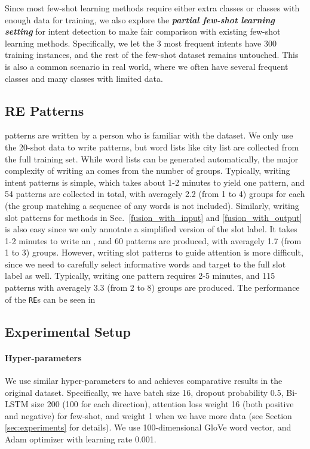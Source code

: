 Since most few-shot learning methods require either extra classes or classes with enough data for training, we also explore the \textbf{\emph{partial few-shot learning setting}} for intent detection to make fair comparison with existing few-shot learning methods. Specifically, we let the 3 most frequent intents have 300 training instances, and the rest of the few-shot dataset remains untouched.
This is also a common scenario in real world, where we often have several frequent classes and many classes with limited data.

\subsection{RE Patterns}
\label{re_in_exp}
\RE patterns are written by a person who is familiar with the dataset.
We only use the 20-shot data to write \RE patterns, but word lists like city list are collected from the full training set. 
While word lists can be generated automatically, the major complexity of writing an \RE comes from the number of groups.
Typically, writing intent patterns is simple, which takes about 1-2 minutes to yield one pattern, and 54 patterns are collected in total, with averagely 2.2 (from 1 to 4) groups for each \RE (the group matching a sequence of any words is not included). 
Similarly, writing slot patterns for methods in Sec.~\ref{fusion_with_input} and \ref{fusion_with_output} is also easy since we only annotate a simplified version of the slot label. It takes 1-2 minutes to write an \RE, and 60 patterns are produced, with averagely 1.7 (from 1 to 3) groups.
However, writing slot patterns to guide attention is more difficult, since we need to carefully select informative words and target to the full slot label as well. Typically, writing one pattern requires 2-5 minutes, and 115 patterns with averagely 3.3 (from 2 to 8) groups are produced.
The performance of the \texttt{RE}s can be seen in 


\subsection{Experimental Setup}
\paragraph{Hyper-parameters}
We use similar hyper-parameters to \cite{liu2016attention} and achieves comparative results in the original dataset. Specifically, we have batch size 16, dropout probability 0.5, Bi-LSTM size 200 (100 for each direction), attention loss weight 16 (both positive and negative) for few-shot, and weight 1 when we have more data (see Section \ref{sec:experiments} for details). We use 100-dimensional GloVe \cite{pennington2014glove} word vector, and Adam optimizer \cite{kingma2014adam} with learning rate 0.001.


